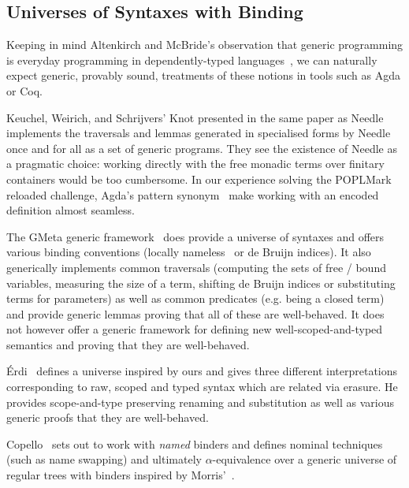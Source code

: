 \subsection{Universes of Syntaxes with Binding} Keeping in mind Altenkirch
and McBride's observation that generic programming is everyday programming
in dependently-typed languages~\citeyear{genericprogramming-dtp}, we can naturally
expect generic, provably sound, treatments of these notions in tools such as
Agda or Coq.

Keuchel, Weirich, and Schrijvers' Knot presented in the same paper as
Needle~\citeyear{needleandknot} implements the traversals and lemmas generated
in specialised forms by Needle once and for all as a set of generic programs.
They see the existence of Needle as a pragmatic choice: working directly with
the free monadic terms over finitary containers would be too cumbersome. In
our experience solving the POPLMark reloaded challenge, Agda's pattern
synonym~\cite{Pickering:patsyn} make working with an encoded definition almost
seamless.

The GMeta generic framework~\citeyear{gmeta} does provide a universe of syntaxes
and offers various binding conventions (locally nameless~\cite{Charguéraud2012}
or de Bruijn indices). It also generically implements common traversals (computing
the sets of free / bound variables, measuring the size of a term, shifting
de Bruijn indices or substituting terms for parameters) as well as common
predicates (e.g. being a closed term) and provide generic lemmas proving that
all of these are well-behaved. It does not however offer a generic framework
for defining new well-scoped-and-typed semantics and proving that they are
well-behaved.

Érdi~\citeyear{gergodraft} defines a universe inspired by ours and gives three
different interpretations corresponding to raw, scoped and typed syntax
which are related via erasure. He provides scope-and-type preserving renaming
and substitution as well as various generic proofs that they are well-behaved.

Copello~\citeyear{copello2017} sets out to work with \emph{named} binders and
defines nominal techniques (such as name swapping) and ultimately $\alpha$-equivalence
over a generic universe of regular trees with binders inspired by Morris'~\citeyear{morris-regulartt}.







